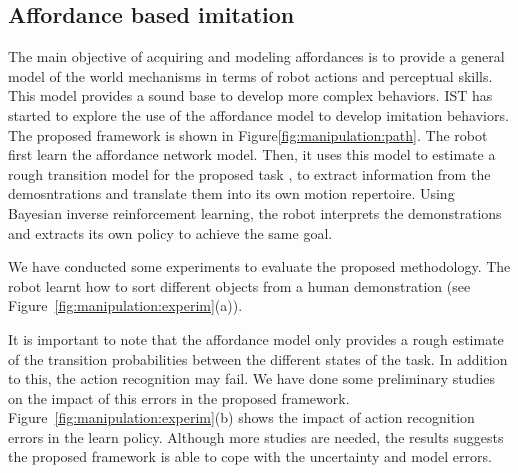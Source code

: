 \subsection{Affordance based imitation}
The main objective of acquiring and modeling affordances is to provide
a general model of the world mechanisms in terms of robot actions and
perceptual skills. This model provides a sound base to develop more
complex behaviors. IST has started to explore the use of the
affordance model to develop imitation behaviors. The proposed
framework is shown in Figure\ref{fig:manipulation:path}. The robot
first learn the affordance network model. Then, it uses this model to
estimate a rough transition model for the proposed task , to extract
information from the demosntrations and translate them into its own
motion repertoire. Using Bayesian inverse reinforcement learning, the
robot interprets the demonstrations and extracts its own policy to
achieve the same goal.

We have conducted some experiments to evaluate the proposed methodology. The robot learnt how to sort different objects from a human demonstration (see Figure~\ref{fig:manipulation:experim}(a)).
 
It is important to note that the affordance model only provides a
rough estimate of the transition probabilities between the different
states of the task. In addition to this, the action recognition may
fail. We have done some preliminary studies on the impact of this
errors in the proposed
framework. Figure~\ref{fig:manipulation:experim}(b) shows the impact
of action recognition errors in the learn policy. Although more
studies are needed, the results suggests the proposed framework is
able to cope with the uncertainty and model errors.

